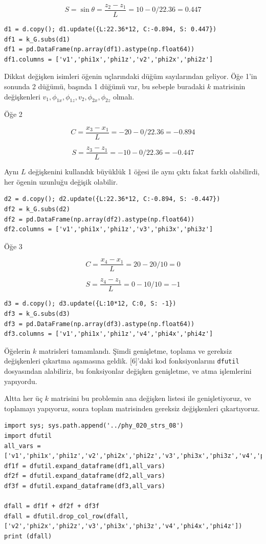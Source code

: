\documentclass[12pt,fleqn]{article}\usepackage{../../common}
\begin{document}
$$
S = \sin \theta = \frac{z_2-z_1}{L} = 10-0 / 22.36 = 0.447
$$

\begin{verbatim}
d1 = d.copy(); d1.update({L:22.36*12, C:-0.894, S: 0.447})
df1 = k_G.subs(d1)
df1 = pd.DataFrame(np.array(df1).astype(np.float64))
df1.columns = ['v1','phi1x','phi1z','v2','phi2x','phi2z']
\end{verbatim}

Dikkat değişken isimleri öğenin uçlarındaki düğüm sayılarından geliyor. Öğe 1'in
sonunda 2 düğümü, başında 1 düğümü var, bu sebeple buradaki $k$ matrisinin
değişkenleri $v_1,\phi_{1x},\phi_{1z},v_2,\phi_{2x},\phi_{2z}$ olmalı.

Öğe 2

$$
C = \frac{x_3-x_1}{L} = -20-0 / 22.36 = -0.894
$$

$$
S = \frac{z_3-z_1}{L} = -10-0 / 22.36 = -0.447
$$

Aynı $L$ değişkenini kullandık büyüklük 1 öğesi ile aynı çıktı fakat farklı
olabilirdi, her ögenin uzunluğu değişik olabilir.

\begin{verbatim}
d2 = d.copy(); d2.update({L:22.36*12, C:-0.894, S: -0.447})
df2 = k_G.subs(d2)
df2 = pd.DataFrame(np.array(df2).astype(np.float64))
df2.columns = ['v1','phi1x','phi1z','v3','phi3x','phi3z']
\end{verbatim}

Öğe 3

$$
C = \frac{x_4-x_1}{L} = 20-20 / 10 = 0
$$

$$
S = \frac{z_4-z_1}{L} = 0-10 / 10 = -1
$$

\begin{verbatim}
d3 = d.copy(); d3.update({L:10*12, C:0, S: -1})
df3 = k_G.subs(d3)
df3 = pd.DataFrame(np.array(df3).astype(np.float64))
df3.columns = ['v1','phi1x','phi1z','v4','phi4x','phi4z']
\end{verbatim}

Öğelerin $k$ matrisleri tamamlandı. Şimdi genişletme, toplama ve gereksiz
değişkenleri çıkartma aşamasına geldik. [6]'daki kod fonksiyonlarını
\verb!dfutil! dosyasından alabiliriz, bu fonksiyonlar değişken genişletme, ve
atma işlemlerini yapıyordu.

Altta her üç $k$ matrisini bu problemin ana değişken listesi ile genişletiyoruz,
ve toplamayı yapıyoruz, sonra toplam matrisinden gereksiz değişkenleri
çıkartıyoruz.

\begin{verbatim}  
import sys; sys.path.append('../phy_020_strs_08')
import dfutil
all_vars = ['v1','phi1x','phi1z','v2','phi2x','phi2z','v3','phi3x','phi3z','v4','phi4x','phi4z']
df1f = dfutil.expand_dataframe(df1,all_vars)
df2f = dfutil.expand_dataframe(df2,all_vars)
df3f = dfutil.expand_dataframe(df3,all_vars)
  
dfall = df1f + df2f + df3f
dfall = dfutil.drop_col_row(dfall, ['v2','phi2x','phi2z','v3','phi3x','phi3z','v4','phi4x','phi4z'])
print (dfall)
\end{verbatim}
\end{document}
